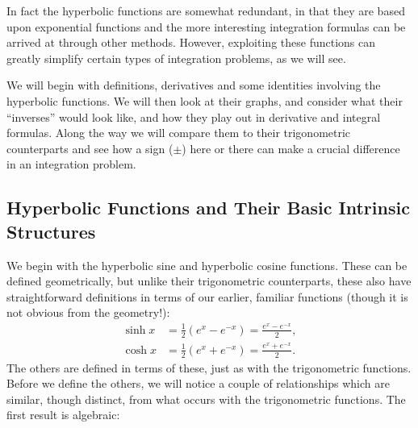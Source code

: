 In fact the hyperbolic functions are somewhat redundant, in that
they are based upon exponential functions and the more interesting
integration formulas can be arrived at through other methods.  However,
exploiting these functions can greatly simplify certain types of 
integration problems, as we will see.

We will begin with definitions, derivatives and some identities 
involving the hyperbolic functions.  We will then 
look at their graphs, and consider what their ``inverses'' 
would look like, and how they play out in derivative and integral
formulas.  Along the way we will compare them to their trigonometric
counterparts and see how a sign ($\pm$) here or there can make
a crucial difference in an integration problem.

\subsection{Hyperbolic Functions and Their Basic Intrinsic Structures}
We begin with the hyperbolic sine and hyperbolic cosine functions.
These can be defined geometrically, but unlike their trigonometric
counterparts, these also have  straightforward definitions
in terms of our earlier, familiar functions (though it is not 
obvious from the geometry!):
\begin{align}
\sinh x&=\frac12\left(e^x-e^{-x}\right)=\frac{e^x-e^{-x}}{2},
      \label{DefSinh}\\
\cosh x&=\frac12\left(e^x+e^{-x}\right)=\frac{e^x+e^{-x}}2.
      \label{DefCosh}
\end{align}
The others are defined in terms of these, just as with the
trigonometric functions.  Before we define 
the others, we will notice a couple of relationships which are
similar, though distinct, from what occurs with the trigonometric
functions.  The first result is algebraic:

